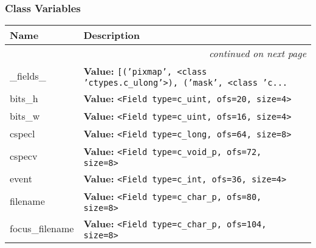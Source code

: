 
  \subsubsection{Class Variables}

    \vspace{-1cm}
\hspace{\varindent}\begin{longtable}{|p{\varnamewidth}|p{\vardescrwidth}|l}
\cline{1-2}
\cline{1-2} \centering \textbf{Name} & \centering \textbf{Description}& \\
\cline{1-2}
\endhead\cline{1-2}\multicolumn{3}{r}{\small\textit{continued on next page}}\\\endfoot\cline{1-2}
\endlastfoot\raggedright \_\-f\-i\-e\-l\-d\-s\-\_\- & \raggedright \textbf{Value:} 
{\tt \texttt{[}\texttt{(}\texttt{'}\texttt{pixmap}\texttt{'}\texttt{, }{\textless}class 'ctypes.c\_ulong'{\textgreater}\texttt{)}\texttt{, }\texttt{(}\texttt{'}\texttt{mask}\texttt{'}\texttt{, }{\textless}class 'c\texttt{...}}&\\
\cline{1-2}
\raggedright b\-i\-t\-s\-\_\-h\- & \raggedright \textbf{Value:} 
{\tt {\textless}Field type=c\_uint, ofs=20, size=4{\textgreater}}&\\
\cline{1-2}
\raggedright b\-i\-t\-s\-\_\-w\- & \raggedright \textbf{Value:} 
{\tt {\textless}Field type=c\_uint, ofs=16, size=4{\textgreater}}&\\
\cline{1-2}
\raggedright c\-s\-p\-e\-c\-l\- & \raggedright \textbf{Value:} 
{\tt {\textless}Field type=c\_long, ofs=64, size=8{\textgreater}}&\\
\cline{1-2}
\raggedright c\-s\-p\-e\-c\-v\- & \raggedright \textbf{Value:} 
{\tt {\textless}Field type=c\_void\_p, ofs=72, size=8{\textgreater}}&\\
\cline{1-2}
\raggedright e\-v\-e\-n\-t\- & \raggedright \textbf{Value:} 
{\tt {\textless}Field type=c\_int, ofs=36, size=4{\textgreater}}&\\
\cline{1-2}
\raggedright f\-i\-l\-e\-n\-a\-m\-e\- & \raggedright \textbf{Value:} 
{\tt {\textless}Field type=c\_char\_p, ofs=80, size=8{\textgreater}}&\\
\cline{1-2}
\raggedright f\-o\-c\-u\-s\-\_\-f\-i\-l\-e\-n\-a\-m\-e\- & \raggedright \textbf{Value:} 
{\tt {\textless}Field type=c\_char\_p, ofs=104, size=8{\textgreater}}&\\

\end{longtable}
